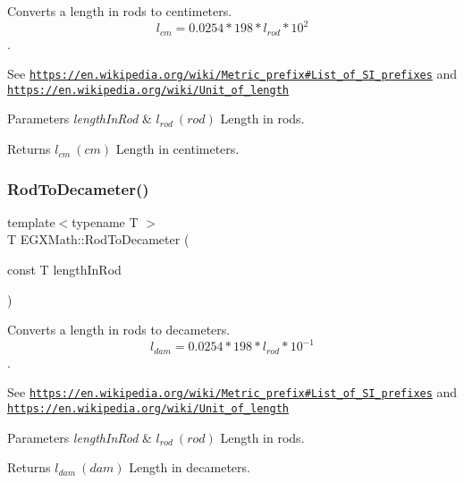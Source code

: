 Converts a length in rods to centimeters. \[ l_{cm}=0.0254 * 198 * l_{rod} * 10^{2} \]. 

See \href{https://en.wikipedia.org/wiki/Metric_prefix#List_of_SI_prefixes}{\tt https\+://en.\+wikipedia.\+org/wiki/\+Metric\+\_\+prefix\#\+List\+\_\+of\+\_\+\+S\+I\+\_\+prefixes} and \href{https://en.wikipedia.org/wiki/Unit_of_length}{\tt https\+://en.\+wikipedia.\+org/wiki/\+Unit\+\_\+of\+\_\+length} 
\begin{DoxyParams}{Parameters}
{\em length\+In\+Rod} & $ l_{rod}\ (rod)$ Length in rods. \\
\hline
\end{DoxyParams}
\begin{DoxyReturn}{Returns}
$ l_{cm}\ (cm)$ Length in centimeters. 
\end{DoxyReturn}
\mbox{\label{group___e_g_x_math-_conversions-_length_conversions-_surveyors-_rod-_s_i_gaecb39eb3cc482aa4586ecbce219b6f34}} 
\subsubsection{\texorpdfstring{Rod\+To\+Decameter()}{RodToDecameter()}}
{\footnotesize\ttfamily template$<$typename T $>$ \\
T E\+G\+X\+Math\+::\+Rod\+To\+Decameter (\begin{DoxyParamCaption}\item[{const T}]{length\+In\+Rod }\end{DoxyParamCaption})}



Converts a length in rods to decameters. \[ l_{dam}=0.0254 * 198 * l_{rod} * 10^{-1} \]. 

See \href{https://en.wikipedia.org/wiki/Metric_prefix#List_of_SI_prefixes}{\tt https\+://en.\+wikipedia.\+org/wiki/\+Metric\+\_\+prefix\#\+List\+\_\+of\+\_\+\+S\+I\+\_\+prefixes} and \href{https://en.wikipedia.org/wiki/Unit_of_length}{\tt https\+://en.\+wikipedia.\+org/wiki/\+Unit\+\_\+of\+\_\+length} 
\begin{DoxyParams}{Parameters}
{\em length\+In\+Rod} & $ l_{rod}\ (rod)$ Length in rods. \\
\hline
\end{DoxyParams}
\begin{DoxyReturn}{Returns}
$ l_{dam}\ (dam)$ Length in decameters. 
\end{DoxyReturn}
\mbox{\label{group___e_g_x_math-_conversions-_length_conversions-_surveyors-_rod-_s_i_gafaf133f63aeedbfc19093745bd005dca}} 
